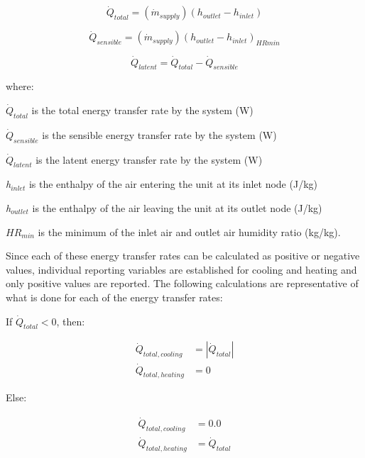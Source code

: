 \begin{equation}
{\dot Q_{total}} = ({\dot m_{supply}})({h_{outlet}} - {h_{inlet}})
\end{equation}

\begin{equation}
{\dot Q_{sensible}} = ({\dot m_{supply}}){({h_{outlet}} - {h_{inlet}})_{HRmin}}
\end{equation}

\begin{equation}
{\dot Q_{latent}} = {\dot Q_{total}} - {\dot Q_{sensible}}
\end{equation}

where:

\(\dot{Q}_{total}\) is the total energy transfer rate by the system (W)

\(\dot{Q}_{sensible}\) is the sensible energy transfer rate by the system (W)

\(\dot{Q}_{latent}\) is the latent energy transfer rate by the system (W)

\emph{h\(_{inlet}\)} is the enthalpy of the air entering the unit at its inlet node (J/kg)

\emph{h\(_{outlet}\)} is the enthalpy of the air leaving the unit at its outlet node (J/kg)

\(H{R_{min}}\) is the minimum of the inlet air and outlet air humidity ratio (kg/kg).

Since each of these energy transfer rates can be calculated as positive or negative values, individual reporting variables are established for cooling and heating and only positive values are reported. The following calculations are representative of what is done for each of the energy transfer rates:

If $\dot{Q}_{total}<0$, then:

\begin{equation}
  \begin{array}{rl}
    \dot{Q}_{total,cooling} &= \left|\dot{Q}_{total}\right| \\
    \dot{Q}_{total,heating} &= 0
  \end{array}
\end{equation}

Else:

\begin{equation} 
  \begin{array}{rl}
    \dot{Q}_{total,cooling} &= 0.0 \\
    \dot{Q}_{total,heating} &= \dot{Q}_{total}
  \end{array}
\end{equation}

